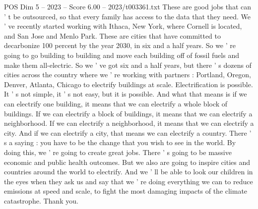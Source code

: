 \begin{textsample}{POS Dim 5 – 2023 – Score 6.00 – 2023/t003361.txt}
These are good jobs that can ' t be outsourced, so that every family has access to the data that they need.
We ' ve recently started working with Ithaca, New York, where Cornell is located, and San Jose and Menlo Park.
These are cities that have committed to decarbonize 100 percent by the year 2030, in six and a half years.
So we ' re going to go building to building and move each building off of fossil fuels and make them all-electric.
So we ' ve got six and a half years, but there ' s dozens of cities across the country where we ' re working with partners : Portland, Oregon, Denver, Atlanta, Chicago to electrify buildings at scale.
Electrification is possible.
It ' s not simple, it ' s not easy, but it is possible.
And what that means is if we can electrify one building, it means that we can electrify a whole block of buildings.
If we can electrify a block of buildings, it means that we can electrify a neighborhood.
If we can electrify a neighborhood, it means that we can electrify a city.
And if we can electrify a city, that means we can electrify a country.
There ' s a saying : you have to be the change that you wish to see in the world.
By doing this, we ' re going to create great jobs.
There ' s going to be massive economic and public health outcomes.
But we also are going to inspire cities and countries around the world to electrify.
And we ' ll be able to look our children in the eyes when they ask us and say that we ' re doing everything we can to reduce emissions at speed and scale, to fight the most damaging impacts of the climate catastrophe.
Thank you.

\end{textsample}
